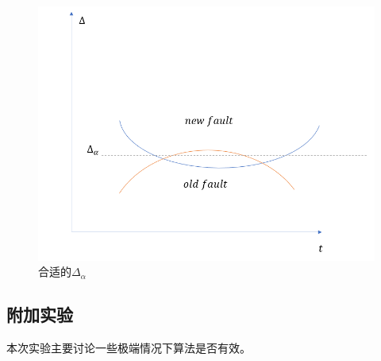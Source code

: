 \documentclass[lang=cn,11pt,a4paper]{elegantpaper}
\begin{document}
\begin{figure}[H] %
	\centering %
	\includegraphics[width=1.0\textwidth]{newfault} %
	\caption{合适的$\Delta_{\alpha}$} %
	\label{Fig.main2} %
\end{figure}
\subsection{附加实验}
本次实验主要讨论一些极端情况下算法是否有效。
\end{document}
